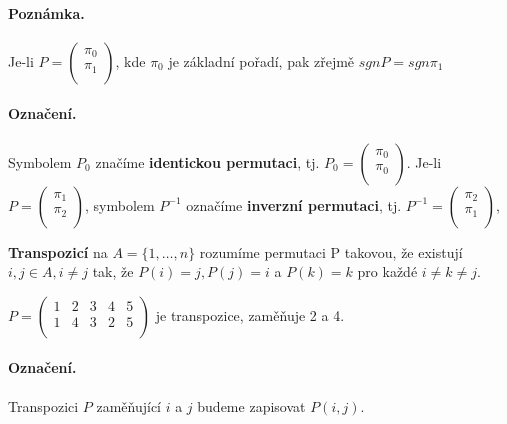 \paragraph{Poznámka.} Je-li $P = \left( \begin{array}{c} \pi_0 \\ \pi_1 \\ \end{array} \right)$, kde $\pi_0$ je základní pořadí, pak zřejmě $sgnP = sgn\pi_1$

\paragraph{Označení.} Symbolem $P_0$ značíme \textbf{identickou permutaci}, tj. $P_0 = \left( \begin{array}{c} \pi_0 \\ \pi_0 \\ \end{array} \right)$. Je-li $P = \left( \begin{array}{c} \pi_1 \\ \pi_2 \\ \end{array} \right)$, symbolem $P^{-1}$ označíme \textbf{inverzní permutaci}, tj. $P^{-1} = \left( \begin{array}{c} \pi_2 \\ \pi_1 \\ \end{array} \right)$,

\begin{definition}
	\textbf{Transpozicí} na $A = \{1, \dots, n\}$ rozumíme permutaci P takovou, že existují $i,j \in A, i \not= j$ tak, že $P(i) = j, P(j) = i$ a $P(k) = k$ pro každé $i \not= k \not= j$.
\end{definition}

\begin{example}
	$P = \left( \begin{array}{cccccc} 1 & 2 & 3 & 4 & 5\\ 1 & 4 & 3 & 2 & 5 \\ \end{array} \right)$ je transpozice, zaměňuje 2 a 4.
\end{example}

\paragraph{Označení.} Transpozici $P$ zaměňující $i$ a $j$ budeme zapisovat $P(i,j)$.


